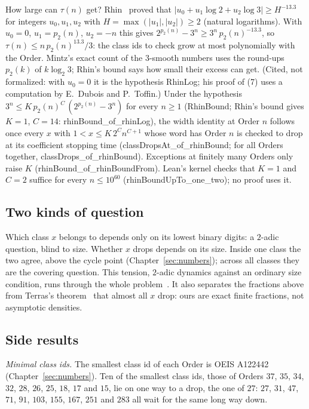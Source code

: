 \documentclass[11pt,a4paper,titlepage]{article}
\newcommand{\lean}[1]{\textsf{#1}}
\begin{document}
How large can $\tau(n)$ get? Rhin~\cite[Proposition, p.~160, (7)]{Rhin1987} proved
that $|u_0 + u_1 \log 2 + u_2 \log 3| \ge H^{-13.3}$ for integers $u_0, u_1, u_2$ with
$H = \max(|u_1|, |u_2|) \ge 2$ (natural logarithms). With $u_0 = 0$, $u_1 = p_2(n)$,
$u_2 = -n$ this gives
$2^{p_2(n)} - 3^n \ge 3^n\,p_2(n)^{-13.3}$, so $\tau(n) \le n\,p_2(n)^{13.3}/3$:
the class ids to check grow at most polynomially with the Order. Mintz's exact
count of the $3$-smooth numbers uses the round-ups $p_2(k)$ of $k\log_2 3$; Rhin's bound says
how small their excess can get. (Cited, not formalized: with $u_0 = 0$ it is the hypothesis \lean{RhinLog}; his proof
of (7) uses a computation by E.~Dubois and P.~Toffin.)
Under the hypothesis $3^n \le K\,p_2(n)^C\,(2^{p_2(n)} - 3^n)$ for every $n \ge 1$
(\lean{RhinBound}; Rhin's bound gives $K = 1$, $C = 14$: \lean{rhinBound\_of\_rhinLog}), the width identity at
Order $n$ follows once every $x$ with $1 < x \le K\,2^C n^{C+1}$ whose word has
Order $n$ is checked to drop at its coefficient stopping time
(\lean{classDropsAt\_of\_rhinBound}; for all Orders together,
\lean{classDrops\_of\_rhinBound}). Exceptions at finitely many Orders only raise
$K$ (\lean{rhinBound\_of\_rhinBoundFrom}). Lean's kernel checks that $K = 1$ and
$C = 2$ suffice for every $n \le 10^{60}$ (\lean{rhinBoundUpTo\_one\_two}); no proof uses it.

\subsection*{Two kinds of question}

Which class $x$ belongs to depends only on its lowest binary digits: a $2$-adic
question, blind to size. Whether $x$ drops depends on its size. Inside one class
the two agree, above the cycle point (Chapter~\ref{sec:numbers}); across all
classes they are the covering question. This tension, $2$-adic dynamics against
an ordinary size condition, runs through the whole problem~\cite{Lagarias1985}.
It also separates the fractions above from Terras's theorem~\cite{Terras1976}
that almost all $x$ drop: ours are exact finite fractions, not asymptotic
densities.

\subsection*{Side results}

\emph{Minimal class ids.} The smallest class id of each Order is OEIS
A122442~\cite{OEIS_A122442} (Chapter~\ref{sec:numbers}). Ten of the smallest class ids, those of Orders $37$, $35$, $34$, $32$, $28$, $26$,
$25$, $18$, $17$ and $15$, lie on one way to a drop, the one of $27$: $27$, $31$, $47$,
$71$, $91$, $103$, $155$, $167$, $251$ and $283$ all wait for the same long way down.
\end{document}
